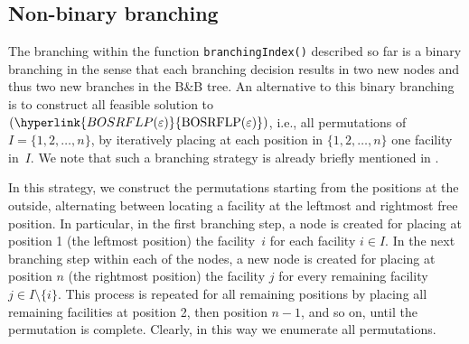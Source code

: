\documentclass{article}
\newcommand{\myrefmath}[1]{(\hyperlink{#1}{\mathrm{#1}})}
\newcommand{\BB}{B\&B\xspace}
\begin{document}
\subsection{Non-binary branching}\label{sec:nonBin}

The branching within the function \texttt{branchingIndex()} described so far is a binary branching in the sense that each branching decision results in two new nodes and thus two new branches in the \BB tree. An alternative to this binary branching is to construct all feasible solution to $\myrefmath{BOSRFLP(\varepsilon)}$, i.e., all permutations of $I=\{1,2,\dots,n\}$, by iteratively placing at each position in $\{1,2,\dots,n\}$ one facility in~$I$. We note that such a branching strategy is already briefly mentioned in \citet{Schwiddessen2020}.

In this strategy, we construct the permutations starting from the positions at the outside, alternating between locating a facility at the leftmost and rightmost free position. 
In particular, in the first branching step, a node is created for placing at position 1 (the leftmost position) the facility~$i$ for each facility $i \in I$.
In the next branching step within each of the nodes, a new node is created for placing at position $n$ (the rightmost position) the facility $j$ for every remaining facility $j\in I \setminus \{i\}$. This process is repeated for all remaining positions by placing all remaining facilities at position 2, then position $n-1$, and so on, until the permutation is complete. Clearly, in this way we enumerate all permutations.
    
\end{document}
